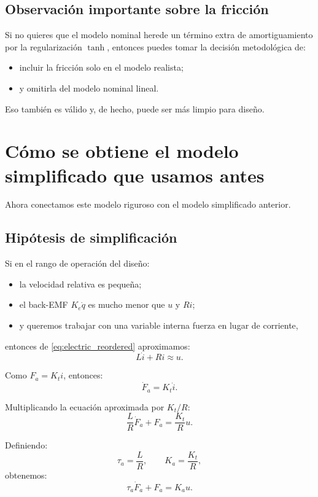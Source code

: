 \documentclass[11pt]{article}
\begin{document}
\subsection{Observaci\'on importante sobre la fricci\'on}

Si no quieres que el modelo nominal herede un t\'ermino extra de amortiguamiento por la regularizaci\'on $\tanh$, entonces puedes tomar la decisi\'on metodol\'ogica de:

\begin{itemize}[leftmargin=1.2cm]
\item incluir la fricci\'on solo en el modelo realista;
\item y omitirla del modelo nominal lineal.
\end{itemize}

Eso tambi\'en es v\'alido y, de hecho, puede ser m\'as limpio para dise\~no.

\section{C\'omo se obtiene el modelo simplificado que usamos antes}

Ahora conectamos este modelo riguroso con el modelo simplificado anterior.

\subsection{Hip\'otesis de simplificaci\'on}

Si en el rango de operaci\'on del dise\~no:

\begin{itemize}[leftmargin=1.2cm]
\item la velocidad relativa es peque\~na;
\item el back-EMF $K_e\dot q$ es mucho menor que $u$ y $Ri$;
\item y queremos trabajar con una variable interna fuerza en lugar de corriente,
\end{itemize}
entonces de \eqref{eq:electric_reordered} aproximamos:
\[
L\dot i + Ri \approx u.
\]

Como $F_a=K_t i$, entonces:
\[
\dot F_a = K_t \dot i.
\]

Multiplicando la ecuaci\'on aproximada por $K_t/R$:
\[
\frac{L}{R}\dot F_a + F_a = \frac{K_t}{R}u.
\]

Definiendo:
\[
\tau_a = \frac{L}{R},
\qquad
K_a = \frac{K_t}{R},
\]
obtenemos:
\begin{equation}
\tau_a\dot F_a + F_a = K_a u.
\label{eq:simplified_force_model}
\end{equation}
\end{document}
